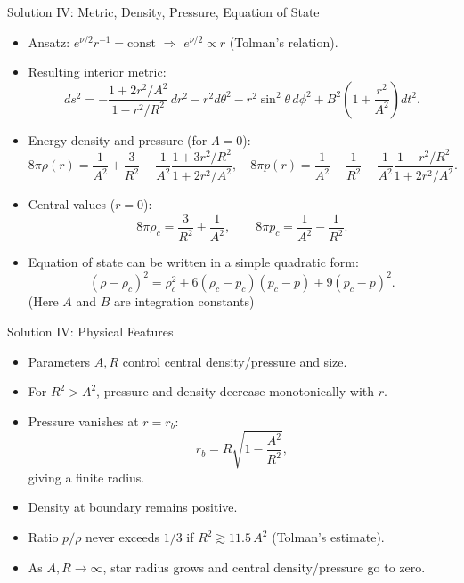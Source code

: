 \documentclass[11pt]{beamer}
\begin{document}
\begin{frame}{Solution IV: Metric, Density, Pressure, Equation of State}
  \small
  \begin{itemize}
    \item Ansatz: $e^{\nu/2} r^{-1} = \text{const}$ $\Rightarrow$ $e^{\nu/2} \propto r$ (Tolman’s relation).
    \item Resulting interior metric:
      \[
        ds^2 = -\frac{1+2r^2/A^2}{1-r^2/R^2} \, dr^2
               - r^2 d\theta^2 - r^2 \sin^2\theta\, d\phi^2
               + B^2 \left(1+\frac{r^2}{A^2}\right) dt^2 .
      \]

    \item Energy density and pressure (for $\Lambda=0$):
      \[
        8\pi \rho(r) = \frac{1}{A^2} + \frac{3}{R^2}
                       - \frac{1}{A^2} \frac{1+3r^2/R^2}{1+2r^2/A^2},
      \quad 
        8\pi p(r) = \frac{1}{A^2} - \frac{1}{R^2}
                    - \frac{1}{A^2}\frac{1-r^2/R^2}{1+2r^2/A^2}.
      \]
    \item Central values ($r=0$):
      \[
        8\pi \rho_c = \frac{3}{R^2} + \frac{1}{A^2}, \qquad
        8\pi p_c     = \frac{1}{A^2} - \frac{1}{R^2}.
      \]
    \item Equation of state can be written in a simple quadratic form:
      \[
        ( \rho - \rho_c )^2
         = \rho_c^2 + 6 (\rho_c - p_c)(p_c - p) + 9 (p_c - p)^2 .
      \]
      (Here $A$ and $B$ are integration constants)
  \end{itemize}
\end{frame}

\begin{frame}{Solution IV: Physical Features}
  \small
  \begin{itemize}
    \item Parameters $A, R$ control central density/pressure and size.
    \item For $R^2 > A^2$, pressure and density decrease monotonically with $r$.
    \item Pressure vanishes at $r=r_b$:
      \[
        r_b = R \sqrt{1 - \frac{A^2}{R^2}} ,
      \]
      giving a finite radius.
    \item Density at boundary remains positive.
    \item Ratio $p/\rho$ never exceeds $1/3$ if $R^2 \gtrsim 11.5\, A^2$ (Tolman’s estimate).
    \item As $A,R\to\infty$, star radius grows and central density/pressure go to zero.
  \end{itemize}
\end{frame}
\end{document}
